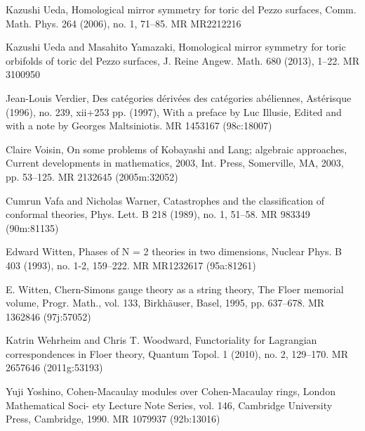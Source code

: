 {\begin{list}{}{%
  \setlength{\leftmargin}{3.4em}%
  \setlength{\itemindent}{-3.4em}%
  \setlength{\itemsep}{1.5pt}%
  \setlength{\parsep}{0pt}%
  \setlength{\listparindent}{0pt}%
}
\item[{[Ued06]}] Kazushi Ueda, Homological mirror symmetry for toric del Pezzo surfaces, Comm. Math. Phys. 264 (2006), no. 1, 71--85. MR MR2212216
\item[{[UY13]}] Kazushi Ueda and Masahito Yamazaki, Homological mirror symmetry for toric orbifolds of toric del Pezzo surfaces, J. Reine Angew. Math. 680 (2013), 1--22. MR 3100950
\item[{[Ver96]}] Jean-Louis Verdier, Des catégories dérivées des catégories abéliennes, Astérisque (1996), no. 239, xii+253 pp. (1997), With a preface by Luc Illusie, Edited and with a note by Georges Maltsiniotis. MR 1453167 (98c:18007)
\item[{[Voi03]}] Claire Voisin, On some problems of Kobayashi and Lang; algebraic approaches, Current developments in mathematics, 2003, Int. Press, Somerville, MA, 2003, pp. 53--125. MR 2132645 (2005m:32052)
\item[{[VW89]}] Cumrun Vafa and Nicholas Warner, Catastrophes and the classification of conformal theories, Phys. Lett. B 218 (1989), no. 1, 51--58. MR 983349 (90m:81135)
\item[{[Wit93]}] Edward Witten, Phases of N = 2 theories in two dimensions, Nuclear Phys. B 403 (1993), no. 1-2, 159--222. MR MR1232617 (95a:81261)
\item[{[Wit95]}] E. Witten, Chern-Simons gauge theory as a string theory, The Floer memorial volume, Progr. Math., vol. 133, Birkhäuser, Basel, 1995, pp. 637--678. MR 1362846 (97j:57052)
\item[{[WW10]}] Katrin Wehrheim and Chris T. Woodward, Functoriality for Lagrangian correspondences in Floer theory, Quantum Topol. 1 (2010), no. 2, 129--170. MR 2657646 (2011g:53193)
\item[{[Yos90]}] Yuji Yoshino, Cohen-Macaulay modules over Cohen-Macaulay rings, London Mathematical Soci- ety Lecture Note Series, vol. 146, Cambridge University Press, Cambridge, 1990. MR 1079937 (92b:13016)
\end{list}
}
